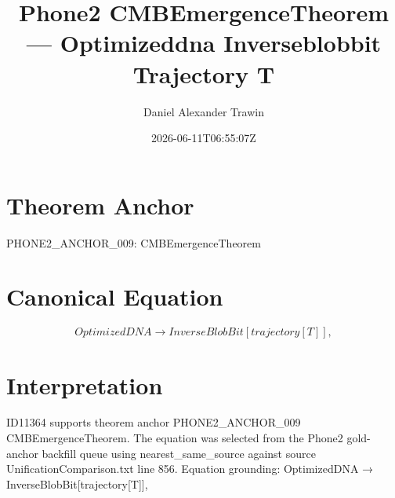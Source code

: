 \documentclass[11pt]{article}
\title{Phone2 CMBEmergenceTheorem — Optimizeddna Inverseblobbit Trajectory T}
\author{Daniel Alexander Trawin}
\date{2026-06-11T06:55:07Z}
\begin{document}
\maketitle
\section*{Theorem Anchor}
PHONE2_ANCHOR_009: CMBEmergenceTheorem
\section*{Canonical Equation}
\[
OptimizedDNA → InverseBlobBit[trajectory[T]],
\]
\section*{Interpretation}
ID11364 supports theorem anchor PHONE2_ANCHOR_009 CMBEmergenceTheorem. The equation was selected from the Phone2 gold-anchor backfill queue using nearest_same_source against source UnificationComparison.txt line 856. Equation grounding: OptimizedDNA → InverseBlobBit[trajectory[T]],
\end{document}
